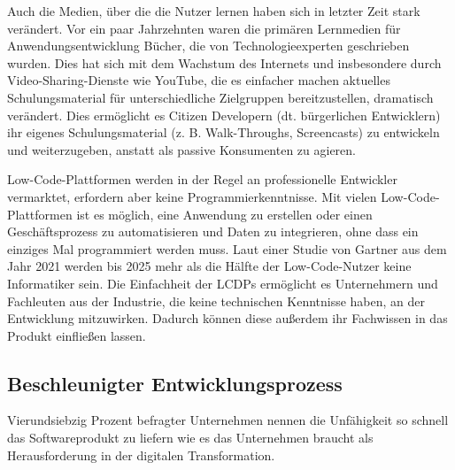 \documentclass[12pt]{article} %
\begin{document}
	Auch die Medien, über die die Nutzer lernen haben sich in letzter Zeit stark verändert. Vor ein paar Jahrzehnten waren die primären Lernmedien für Anwendungsentwicklung Bücher, die von Technologieexperten geschrieben wurden. Dies hat sich mit dem Wachstum des Internets und insbesondere durch Video-Sharing-Dienste wie YouTube, die es einfacher machen aktuelles Schulungsmaterial für unterschiedliche Zielgruppen bereitzustellen, dramatisch verändert.
	Dies ermöglicht es Citizen Developern (dt. bürgerlichen Entwicklern) ihr eigenes Schulungsmaterial (z. B. Walk-Throughs, Screencasts) zu entwickeln und weiterzugeben, anstatt als passive Konsumenten zu agieren. \cite{DiRuscio.2022}
	
	Low-Code-Plattformen werden in der Regel an professionelle Entwickler vermarktet, erfordern aber keine Programmierkenntnisse. Mit vielen Low-Code-Plattformen ist es möglich, eine Anwendung zu erstellen oder einen Geschäftsprozess zu automatisieren und Daten zu integrieren, ohne dass ein einziges Mal programmiert werden muss. \cite{MichelleGardner.2022} Laut einer Studie von Gartner aus dem Jahr 2021 werden bis 2025 mehr als die Hälfte der Low-Code-Nutzer keine Informatiker sein. Die Einfachheit der LCDPs ermöglicht es Unternehmern und Fachleuten aus der Industrie, die keine technischen Kenntnisse haben, an der Entwicklung mitzuwirken. Dadurch können diese außerdem ihr Fachwissen in das Produkt einfließen lassen. \cite{OleksiiGlib.2022}
		
	
	\subsection{Beschleunigter Entwicklungsprozess}	\label{faster}
	Vierundsiebzig Prozent befragter Unternehmen nennen die Unfähigkeit so schnell das Softwareprodukt zu liefern wie es das Unternehmen braucht als Herausforderung in der digitalen Transformation. \cite{EmmaVanPelt.2019} \newline %
	
\end{document}
